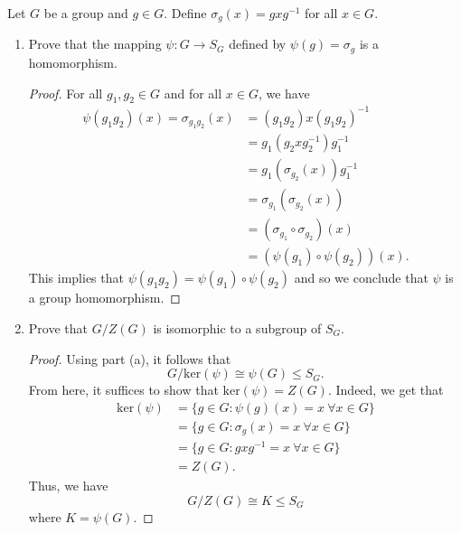 \documentclass[a4paper]{article}
\begin{document}
\begin{problem} Let \( G  \) be a group and \( g \in G  \). Define \( {\sigma}_{g} (x) = g x g^{-1} \) for all \( x \in G  \).
   \begin{enumerate}
       \item[(a)] Prove that the mapping \( \psi : G \to {S}_{G} \) defined by \( \psi(g) = {\sigma}_{g} \) is a homomorphism.
           \begin{proof}
           For all \( {g}_{1}, {g}_{2} \in G  \) and for all \( x \in G  \), we have 
           \begin{align*}
               \psi({g}_{1}{g}_{2})(x) = {\sigma}_{{g}_{1}{g}_{2}}(x) &= ({g}_{1}{g}_{2})x ({g}_{1} {g}_{2})^{-1}  \\
                                                                      &={g}_{1} ({g}_{2} x {g}_{2}^{-1}) {g}_{1}^{-1} \\
                                                                      &= {g}_{1}({\sigma}_{{g}_{2}}(x)) {g}_{1}^{-1} \\
                                                                      &= {\sigma}_{{g}_{1}}({\sigma}_{{g}_{2}}(x)) \\
                                                                      &= (\sigma_{{g}_{1}} \circ \sigma_{{g}_{2}})(x) \\
                                                                      &= (\psi({g}_{1}) \circ \psi({g}_{2})) (x).
           \end{align*}
           This implies that \( \psi({g}_{1}{g}_{2}) = \psi({g}_{1})\circ \psi({g}_{2}) \) and so we conclude that \( \psi \) is a group homomorphism.
           \end{proof}
        \item[(b)] Prove that \( G / Z(G) \) is isomorphic to a subgroup of \( {S}_{G} \).
            \begin{proof}
            Using part (a), it follows that 
            \[  G / \text{ker}(\psi) \cong \psi(G) \leq {S}_{G}.  \]
            From here, it suffices to show that \( \text{ker}(\psi) = Z(G)  \). Indeed, we get that 
            \begin{align*}
            \text{ker}(\psi) &= \{ g \in G : \psi(g)(x) = x \ \forall x \in G    \}  \\
                             &= \{ g \in G : \sigma_g(x) = x \ \forall x \in G  \}  \\
                             &= \{  g \in G : g x g^{-1}  =x \ \forall  x \in G  \} \\
                             &= Z(G).
            \end{align*}
            Thus, we have 
            \[  G / Z(G) \cong K \leq {S}_{G}  \]
            where \( K = \psi(G) \).
            \end{proof}
   \end{enumerate} 
\end{problem}
\end{document}
